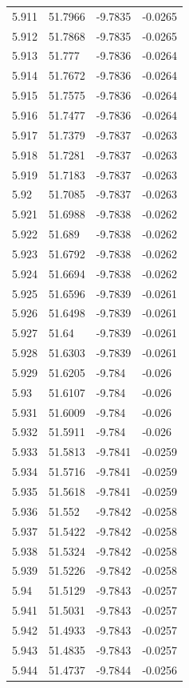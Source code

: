 \begin{tabular}{llll}
5.911 & 51.7966 & -9.7835 & -0.0265 \\
5.912 & 51.7868 & -9.7835 & -0.0265 \\
5.913 & 51.777 & -9.7836 & -0.0264 \\
5.914 & 51.7672 & -9.7836 & -0.0264 \\
5.915 & 51.7575 & -9.7836 & -0.0264 \\
5.916 & 51.7477 & -9.7836 & -0.0264 \\
5.917 & 51.7379 & -9.7837 & -0.0263 \\
5.918 & 51.7281 & -9.7837 & -0.0263 \\
5.919 & 51.7183 & -9.7837 & -0.0263 \\
5.92 & 51.7085 & -9.7837 & -0.0263 \\
5.921 & 51.6988 & -9.7838 & -0.0262 \\
5.922 & 51.689 & -9.7838 & -0.0262 \\
5.923 & 51.6792 & -9.7838 & -0.0262 \\
5.924 & 51.6694 & -9.7838 & -0.0262 \\
5.925 & 51.6596 & -9.7839 & -0.0261 \\
5.926 & 51.6498 & -9.7839 & -0.0261 \\
5.927 & 51.64 & -9.7839 & -0.0261 \\
5.928 & 51.6303 & -9.7839 & -0.0261 \\
5.929 & 51.6205 & -9.784 & -0.026 \\
5.93 & 51.6107 & -9.784 & -0.026 \\
5.931 & 51.6009 & -9.784 & -0.026 \\
5.932 & 51.5911 & -9.784 & -0.026 \\
5.933 & 51.5813 & -9.7841 & -0.0259 \\
5.934 & 51.5716 & -9.7841 & -0.0259 \\
5.935 & 51.5618 & -9.7841 & -0.0259 \\
5.936 & 51.552 & -9.7842 & -0.0258 \\
5.937 & 51.5422 & -9.7842 & -0.0258 \\
5.938 & 51.5324 & -9.7842 & -0.0258 \\
5.939 & 51.5226 & -9.7842 & -0.0258 \\
5.94 & 51.5129 & -9.7843 & -0.0257 \\
5.941 & 51.5031 & -9.7843 & -0.0257 \\
5.942 & 51.4933 & -9.7843 & -0.0257 \\
5.943 & 51.4835 & -9.7843 & -0.0257 \\
5.944 & 51.4737 & -9.7844 & -0.0256 \\

\end{tabular}
